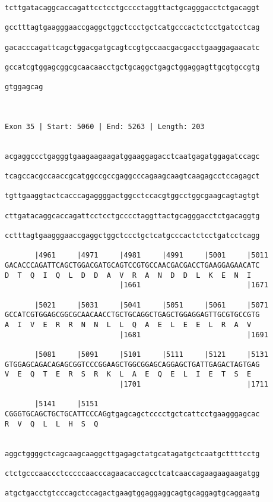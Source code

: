 \documentclass{article}
\begin{document}
\begin{Verbatim}
tcttgatacaggcaccagattcctcctgcccctaggttactgcagggacctctgacaggt

gcctttagtgaagggaaccgaggctggctccctgctcatgcccactctcctgatcctcag

gacacccagattcagctggacgatgcagtccgtgccaacgacgacctgaaggagaacatc

gccatcgtggagcggcgcaacaacctgctgcaggctgagctggaggagttgcgtgccgtg

gtggagcag
         

 
Exon 35 | Start: 5060 | End: 5263 | Length: 203


acgaggccctgagggtgaagaagaagatggaaggagacctcaatgagatggagatccagc

tcagccacgccaaccgcatggccgccgaggcccagaagcaagtcaagagcctccagagct

tgttgaaggtactcacccagaggggactggcctccacgtggcctggcgaagcagtagtgt

cttgatacaggcaccagattcctcctgcccctaggttactgcagggacctctgacaggtg

cctttagtgaagggaaccgaggctggctccctgctcatgcccactctcctgatcctcagg

       |4961     |4971     |4981     |4991     |5001     |5011
GACACCCAGATTCAGCTGGACGATGCAGTCCGTGCCAACGACGACCTGAAGGAGAACATC
D  T  Q  I  Q  L  D  D  A  V  R  A  N  D  D  L  K  E  N  I  
                           |1661                         |1671
  
       |5021     |5031     |5041     |5051     |5061     |5071
GCCATCGTGGAGCGGCGCAACAACCTGCTGCAGGCTGAGCTGGAGGAGTTGCGTGCCGTG
A  I  V  E  R  R  N  N  L  L  Q  A  E  L  E  E  L  R  A  V  
                           |1681                         |1691
  
       |5081     |5091     |5101     |5111     |5121     |5131
GTGGAGCAGACAGAGCGGTCCCGGAAGCTGGCGGAGCAGGAGCTGATTGAGACTAGTGAG
V  E  Q  T  E  R  S  R  K  L  A  E  Q  E  L  I  E  T  S  E  
                           |1701                         |1711
  
       |5141     |5151                                      
CGGGTGCAGCTGCTGCATTCCCAGgtgagcagctcccctgctcattcctgaagggagcac
R  V  Q  L  L  H  S  Q                                      
                                                            
  
aggctggggctcagcaagcaaggcttgagagctatgcatagatgctcaatgcttttcctg
                                                            
ctctgcccaaccctcccccaacccagaacaccagcctcatcaaccagaagaagaagatgg
                                                            
atgctgacctgtcccagctccagactgaagtggaggaggcagtgcaggagtgcaggaatg
                                                            

\end{Verbatim}
\end{document}

